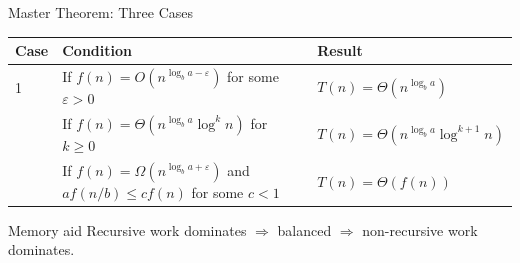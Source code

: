 \documentclass[aspectratio=169]{beamer}
\begin{document}
\begin{frame}{Master Theorem: Three Cases}
  \scriptsize
  \begin{center}
    \renewcommand{\arraystretch}{1.23}
    \begin{tabular}{C{0.13\textwidth}L{0.43\textwidth}L{0.26\textwidth}}
      \toprule
      \textbf{Case} & \textbf{Condition} & \textbf{Result} \\
       & If $f(n)=O\!\left(n^{\log_b a-\varepsilon}\right)$ for some $\varepsilon>0$ & $T(n)=\Theta\!\left(n^{\log_b a}\right)$ \\
       & If $f(n)=\Theta\!\left(n^{\log_b a}\log^k n\right)$ for $k\ge 0$ & $T(n)=\Theta\!\left(n^{\log_b a}\log^{k+1} n\right)$ \\
       & If $f(n)=\Omega\!\left(n^{\log_b a+\varepsilon}\right)$ and $a f(n/b)\le c f(n)$ for some $c<1$ & $T(n)=\Theta(f(n))$ \\
      \bottomrule
    \end{tabular}
  \end{center}
  \vspace{0.25em}
  \begin{alertblock}{Memory aid}
    \centering\small
    Recursive work dominates $\Rightarrow$ balanced $\Rightarrow$ non-recursive work dominates.
  \end{alertblock}
\end{frame}
\end{document}
